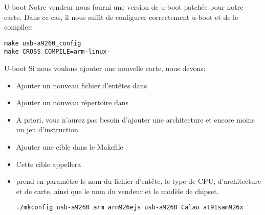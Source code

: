 




\begin{frame}[fragile=singleslide]{U-boot}
  Notre vendeur nous  fourni une version de u-boot  patchée pour notre
  carte. Dans ce cas, il nous suffit de configurer correctement u-boot
  et de le compiler:
  \begin{lstlisting}
make usb-a9260_config
make CROSS_COMPILE=arm-linux-
  \end{lstlisting}
\end{frame}

\begin{frame}[fragile=singleslide]{U-boot}
  Si nous voulons ajouter une nouvelle carte, nous devons:
  \begin{itemize}
  \item Ajouter un nouveau fichier d'entêtes dans 
  \item Ajouter un nouveau répertoire dans 
  \item A priori, vous n'aurez pas besoin d'ajouter une architecture et encore moins un jeu d'instruction
  \item Ajouter une cible dans le Makefile
  \item Cette cible appellera 
  \item {} prend en  paramètre le nom du fichier d'entête,
    le type  de CPU,  d'architecture et de carte,  ainsi que le  nom du
    vendeur et le modèle de chipset.
    \begin{lstlisting} 
./mkconfig usb-a9260 arm arm926ejs usb-a9260 Calao at91sam926x
    \end{lstlisting} 
  \end{itemize}
\end{frame}

